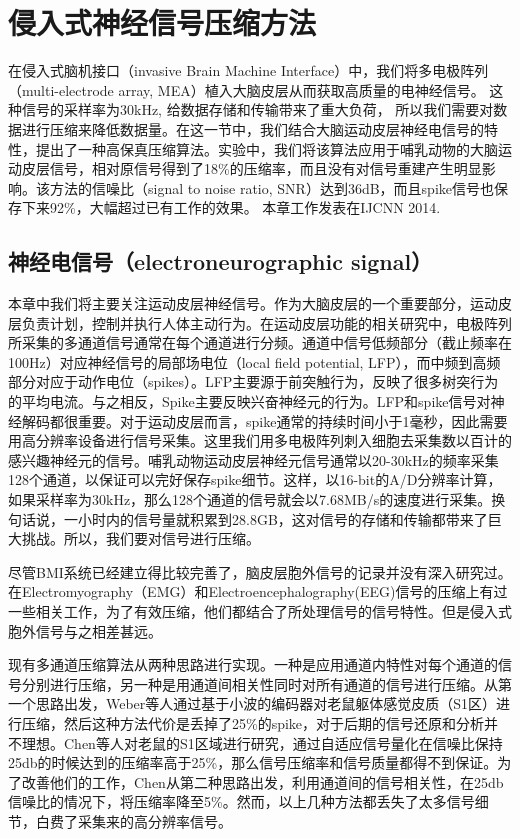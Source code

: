 \chapter{侵入式神经信号压缩方法}

在侵入式脑机接口（invasive Brain Machine Interface）中，我们将多电极阵列（multi-electrode array, MEA）植入大脑皮层从而获取高质量的电神经信号。 这种信号的采样率为30kHz, 给数据存储和传输带来了重大负荷， 所以我们需要对数据进行压缩来降低数据量。在这一节中，我们结合大脑运动皮层神经电信号的特性，提出了一种高保真压缩算法。实验中，我们将该算法应用于哺乳动物的大脑运动皮层信号，相对原信号得到了18\%的压缩率，而且没有对信号重建产生明显影响。该方法的信噪比（signal to noise ratio, SNR）达到36dB，而且spike信号也保存下来92\%，大幅超过已有工作的效果。 本章工作发表在IJCNN 2014\cite{zhang2014high}.

\section{神经电信号（electroneurographic signal）}

本章中我们将主要关注运动皮层神经信号。作为大脑皮层的一个重要部分，运动皮层负责计划，控制并执行人体主动行为。在运动皮层功能的相关研究中，电极阵列所采集的多通道信号通常在每个通道进行分频。通道中信号低频部分（截止频率在100Hz）对应神经信号的局部场电位（local field potential, LFP），而中频到高频部分对应于动作电位（spikes）。LFP主要源于前突触行为，反映了很多树突行为的平均电流。与之相反，Spike主要反映兴奋神经元的行为。LFP和spike信号对神经解码都很重要。对于运动皮层而言，spike通常的持续时间小于1毫秒，因此需要用高分辨率设备进行信号采集。这里我们用多电极阵列刺入细胞去采集数以百计的感兴趣神经元的信号。哺乳动物运动皮层神经元信号通常以20-30kHz的频率采集128个通道，以保证可以完好保存spike细节。这样，以16-bit的A/D分辨率计算，如果采样率为30kHz，那么128个通道的信号就会以7.68MB/s的速度进行采集。换句话说，一小时内的信号量就积累到28.8GB，这对信号的存储和传输都带来了巨大挑战。所以，我们要对信号进行压缩。

尽管BMI系统已经建立得比较完善了，脑皮层胞外信号的记录并没有深入研究过。在Electromyography（EMG）和Electroencephalography(EEG)信号的压缩上有过一些相关工作\cite{}，为了有效压缩，他们都结合了所处理信号的信号特性。但是侵入式胞外信号与之相差甚远。

现有多通道压缩算法从两种思路进行实现。一种是应用通道内特性对每个通道的信号分别进行压缩，另一种是用通道间相关性同时对所有通道的信号进行压缩。从第一个思路出发，Weber等人通过基于小波的编码器对老鼠躯体感觉皮质（S1区）进行压缩，然后这种方法代价是丢掉了25\%的spike，对于后期的信号还原和分析并不理想。Chen等人对老鼠的S1区域进行研究，通过自适应信号量化在信噪比保持25db的时候达到的压缩率高于25\%，那么信号压缩率和信号质量都得不到保证。为了改善他们的工作，Chen从第二种思路出发，利用通道间的信号相关性，在25db信噪比的情况下，将压缩率降至5\%。然而，以上几种方法都丢失了太多信号细节，白费了采集来的高分辨率信号。

